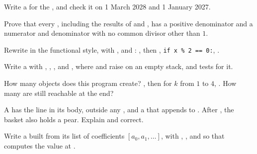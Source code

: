 \begin{exercise}[$\star\star$]\label{exo:g12:classes-and-objects:9}
Write a   for the  , and check it on 1 March 2028 and 1 January 2027.
\end{exercise}

\begin{exercise}[$\star\star$]\label{exo:g12:classes-and-objects:10}
Prove that every , including the results of \code{+} and \code{*}, has a positive denominator and a
numerator and denominator with no common divisor other than $1$.
\end{exercise}

\begin{exercise}[$\star\star$]\label{exo:g12:classes-and-objects:11}
Rewrite in the functional style, with ,  and : , then
, \texttt{if x \% 2 == 0:}, .
\end{exercise}

\begin{exercise}[$\star\star\star$]\label{exo:g12:classes-and-objects:12}
Write a   with , , ,  and , where
 and  raise  on an empty stack, and tests for it.
\end{exercise}

\begin{exercise}[$\star\star\star$]\label{exo:g12:classes-and-objects:13}
How many  objects does this program create? , then for $k$ from $1$ to $4$,
. How many are still reachable at the end?
\end{exercise}

\begin{exercise}[$\star\star\star$]\label{exo:g12:classes-and-objects:14}
A   has the line  in its body, outside any , and a   that
appends to . After , the basket  also holds a pear. Explain and correct.
\end{exercise}

\begin{exercise}[$\star\star\star$]\label{exo:g12:classes-and-objects:15}
Write a   built from its list of coefficients $[a_0, a_1, \dots]$, with ,
, and  so that  computes the value at .
\end{exercise}

